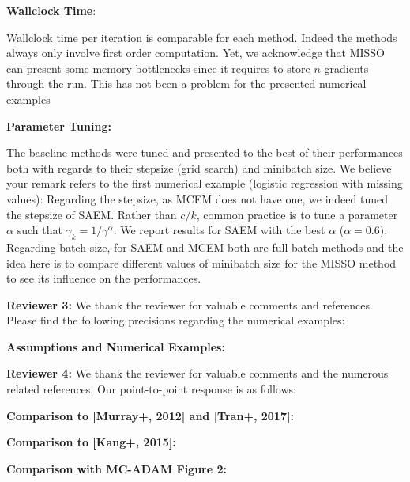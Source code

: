\documentclass{article}
\begin{document}
\textbf{Wallclock Time}:

Wallclock time per iteration is comparable for each method. Indeed the methods always only involve first order computation. Yet, we acknowledge that MISSO can present some memory bottlenecks since it requires to store $n$ gradients through the run. This has not been a problem for the presented numerical examples

\textbf{Parameter Tuning:}

The baseline methods were tuned and presented to the best of their performances both with regards to their stepsize (grid search) and minibatch size.
We believe your remark refers to the first numerical example (logistic regression with missing values): Regarding the stepsize, as MCEM does not have one, we indeed tuned the stepsize of SAEM. Rather than $c/k$, common practice is to tune a parameter $\alpha$ such that $\gamma_k = 1/\gamma^{\alpha}$. We report results for SAEM with the best $\alpha$ ($\alpha = 0.6$). Regarding batch size, for SAEM and MCEM both are full batch methods and the idea here is to compare different values of minibatch size for the MISSO method to see its influence on the performances.



\textbf{\textcolor{yellow!80!black}{Reviewer 3:}} We thank the reviewer for valuable comments and references. Please find the following precisions regarding the numerical examples:

\textbf{Assumptions and Numerical Examples:}



\textbf{\textcolor{green!50!black}{Reviewer 4:}} We thank the reviewer for valuable comments and the numerous related references. Our point-to-point response is as follows:

\textbf{Comparison to [Murray+, 2012] and [Tran+, 2017]:}

\textbf{Comparison to [Kang+, 2015]:}

\textbf{Comparison with MC-ADAM Figure 2:}
\end{document}
